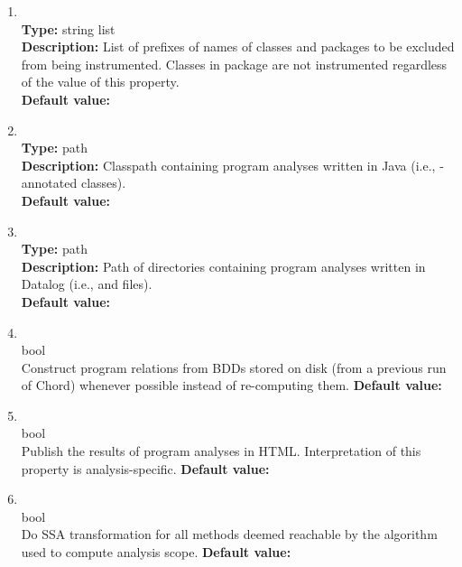 \begin{enumerate}
\item
{} \\
{\bf Type:} string list \\
{\bf Description:} List of prefixes of names of classes and packages to be excluded from being instrumented.  Classes in package  are not instrumented regardless of the value of this property. \\
{\bf Default value:}  

\item
{} \\
{\bf Type:} path \\
{\bf Description:} Classpath containing program analyses written in Java (i.e., -annotated classes). \\
{\bf Default value:}  

\item
{} \\
{\bf Type:} path \\
{\bf Description:} Path of directories containing program analyses written in Datalog (i.e.,  and  files). \\
{\bf Default value:}  

\item
{} \\
 bool \\
 Construct program relations from BDDs stored on disk
(from a previous run of Chord) whenever possible instead of re-computing them.
{\bf Default value:}  \\
\item
{} \\
 bool \\
 Publish the results of program analyses in HTML.
Interpretation of this property is analysis-specific.
{\bf Default value:}  \\

\item
{} \\
 bool \\
 Do SSA transformation for all methods deemed reachable by the
algorithm used to compute analysis scope.
{\bf Default value:}  \\


\end{enumerate}
